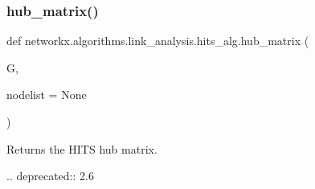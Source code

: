 \subsubsection{\texorpdfstring{hub\+\_\+matrix()}{hub\_matrix()}}
{\footnotesize\ttfamily def networkx.\+algorithms.\+link\+\_\+analysis.\+hits\+\_\+alg.\+hub\+\_\+matrix (\begin{DoxyParamCaption}\item[{}]{G,  }\item[{}]{nodelist = {\ttfamily None} }\end{DoxyParamCaption})}

\begin{DoxyVerb}Returns the HITS hub matrix.

.. deprecated:: 2.6
\end{DoxyVerb}
 